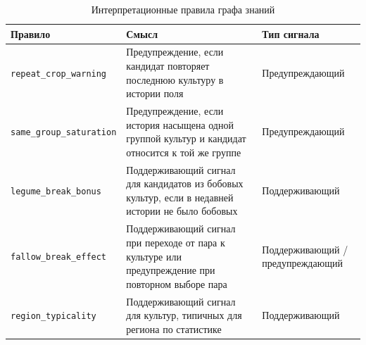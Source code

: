 \begin{table}[H]
\centering
\small
\caption{Интерпретационные правила графа знаний}
\label{tab:kg-rules}
\begin{tabular}{>{\raggedright\arraybackslash}p{}
                >{\raggedright\arraybackslash}p{}
                >{\raggedright\arraybackslash}p{}}
\toprule
Правило & Смысл & Тип сигнала \\
\midrule
\texttt{repeat\_crop\_warning}
  & Предупреждение, если кандидат повторяет последнюю культуру в истории поля
  & Предупреждающий \\
\texttt{same\_group\_saturation}
  & Предупреждение, если история насыщена одной группой культур и кандидат относится к той же группе
  & Предупреждающий \\
\texttt{legume\_break\_bonus}
  & Поддерживающий сигнал для кандидатов из бобовых культур, если в недавней истории не было бобовых
  & Поддерживающий \\
\texttt{fallow\_break\_effect}
  & Поддерживающий сигнал при переходе от пара к культуре или предупреждение при повторном выборе пара
  & Поддерживающий / предупреждающий \\
\texttt{region\_typicality}
  & Поддерживающий сигнал для культур, типичных для региона по статистике
  & Поддерживающий \\
\bottomrule
\end{tabular}
\end{table}
